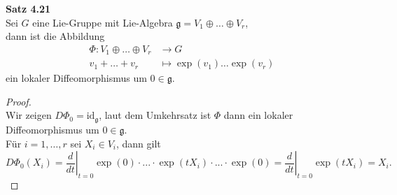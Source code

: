 \documentclass[fleqn, 12pt, letterpaper]{article}
\begin{document}
 \textbf{Satz 4.21}\\
Sei $G$ eine Lie-Gruppe mit Lie-Algebra $\mathfrak{g} = V_1 \oplus \dots \oplus V_r$, \\
dann ist die Abbildung
\[
\begin{aligned}
    \Phi \colon V_1 \oplus \dots \oplus V_r &\longrightarrow G \\
    v_1 + \dots + v_r &\longmapsto \exp(v_1) \dots \exp(v_r)
\end{aligned}
\]
ein lokaler Diffeomorphismus um $0 \in \mathfrak{g}$.
\begin{proof}
\quad\\
    Wir zeigen $D\Phi_0 = \mathrm{id}_{\mathfrak{g}}$, laut dem Umkehrsatz ist $\Phi$ dann ein lokaler Diffeomorphismus um $0 \in \mathfrak{g}$. \\
    Für $i = 1, \dots, r$ sei $X_i \in V_i$, dann gilt
\[
D\Phi_0(X_i) = \left. \frac{d}{dt} \right|_{t=0} \exp(0)\cdot...\cdot\exp(tX_i)\cdot ... \cdot \exp(0) = \left. \frac{d}{dt} \right|_{t=0} \exp(tX_i) = X_i.
\]
\end{proof}
\end{document}
